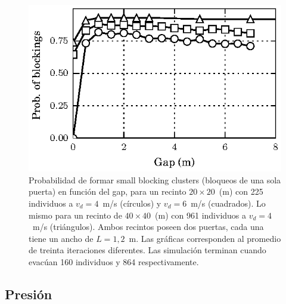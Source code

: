 \begin{figure}[H]
    \centering
    \includegraphics[scale=1.6]{figuras/proba_vsgap_all.eps}
    \caption[width=5cm]{Probabilidad de formar small blocking clusters (bloqueos de una sola puerta) en función del gap, para un recinto $20\times 20$~(m) con 225 individuos a $v_d=4$~m/s (círculos) y $v_d=6$~m/s (cuadrados). Lo mismo para un recinto de $40\times 40$~(m) con 961 individuos a $v_d=4$~m/s (triángulos). Ambos recintos poseen dos puertas, cada una tiene un ancho de $L=1,2$~m. Las gráficas corresponden al promedio de treinta iteraciones diferentes. Las simulación terminan cuando evacúan 160 individuos y 864 respectivamente.}
    \label{proba_vsgap_all}
\end{figure}


\subsection{Presión}

